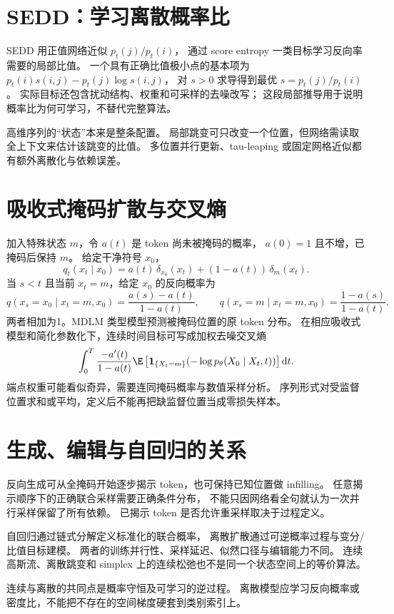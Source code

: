\section{SEDD：学习离散概率比}

SEDD 用正值网络近似 $p_t(j)/p_t(i)$，
通过 score entropy 一类目标学习反向率需要的局部比值。
一个具有正确比值极小点的基本项为
$p_t(i)s(i,j)-p_t(j)\log s(i,j)$，
对 $s>0$ 求导得到最优 $s=p_t(j)/p_t(i)$。
实际目标还包含扰动结构、权重和可采样的去噪改写；
这段局部推导用于说明概率比为何可学习，不替代完整算法。

高维序列的“状态”本来是整条配置。
局部跳变可只改变一个位置，但网络需读取全上下文来估计该跳变的比值。
多位置并行更新、tau-leaping 或固定网格近似都有额外离散化与依赖误差。

\section{吸收式掩码扩散与交叉熵}

加入特殊状态 $m$，令 $a(t)$ 是 token 尚未被掩码的概率，
$a(0)=1$ 且不增，已掩码后保持 $m$。
给定干净符号 $x_0$，
\[
q_t(x_t\mid x_0)=a(t)\,\delta_{x_0}(x_t)+(1-a(t))\,\delta_m(x_t).
\]
当 $s<t$ 且当前 $x_t=m$，给定 $x_0$ 的反向概率为
\[
q(x_s=x_0\mid x_t=m,x_0)=\frac{a(s)-a(t)}{1-a(t)},\qquad
q(x_s=m\mid x_t=m,x_0)=\frac{1-a(s)}{1-a(t)}.
\]
两者相加为1。MDLM 类型模型预测被掩码位置的原 token 分布。
在相应吸收式模型和简化参数化下，连续时间目标可写成加权去噪交叉熵
\begin{equation}\label{th:masked-loss}
\int_0^T\frac{-a'(t)}{1-a(t)}
 \E\left[\mathbf1_{\{X_t=m\}}
 (-\log p_\theta(X_0\mid X_t,t))\right]\mathrm dt.
\end{equation}
端点权重可能看似奇异，需要连同掩码概率与数值采样分析。
序列形式对受监督位置求和或平均，定义后不能再把缺监督位置当成零损失样本。

\section{生成、编辑与自回归的关系}

反向生成可从全掩码开始逐步揭示 token，也可保持已知位置做 infilling。
任意揭示顺序下的正确联合采样需要正确条件分布，
不能只因网络看全句就认为一次并行采样保留了所有依赖。
已揭示 token 是否允许重采样取决于过程定义。

自回归通过链式分解定义标准化的联合概率，
离散扩散通过可逆概率过程与变分/比值目标建模。
两者的训练并行性、采样延迟、似然口径与编辑能力不同。
连续高斯流、离散跳变和 simplex 上的连续松弛也不是同一个状态空间上的等价算法。

\begin{theorytakeaway}
连续与离散的共同点是概率守恒及可学习的逆过程。
离散模型应学习反向概率或密度比，不能把不存在的空间梯度硬套到类别索引上。
\end{theorytakeaway}
